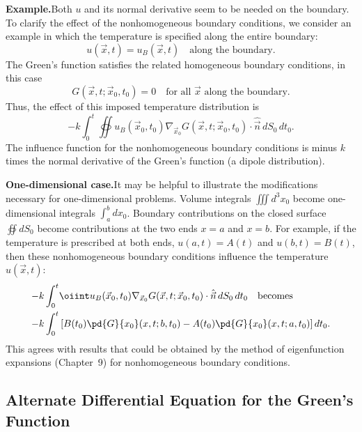 \textbf{Example.}\quad Both $u$ and its normal derivative seem to be needed on the boundary.  To clarify the effect of the nonhomogeneous boundary conditions, we consider an example in which the temperature is specified along the entire boundary:
\[
u(\vec{x},t) = u_B(\vec{x},t) \quad \text{along the boundary.}
\]
The Green's function satisfies the related homogeneous boundary conditions, in this case
\[
G(\vec{x},t;\vec{x}_0,t_0) = 0 \quad \text{for all } \vec{x} \text{ along the boundary.}
\]
Thus, the effect of this imposed temperature distribution is
\[
-k \int_0^t \oiint u_B(\vec{x}_0,t_0)\nabla_{\vec{x}_0} G(\vec{x},t;\vec{x}_0,t_0)\cdot\hat{\vec{n}}\,dS_0\,dt_0.
\]
The influence function for the nonhomogeneous boundary conditions is minus $k$ times the normal derivative of the Green's function (a dipole distribution).

\textbf{One-dimensional case.}\quad It may be helpful to illustrate the modifications necessary for one-dimensional problems.  Volume integrals $\iiint d^3x_0$ become one-dimensional integrals $\int_a^b dx_0$.  Boundary contributions on the closed surface $\oiint dS_0$ become contributions at the two ends $x = a$ and $x = b$.  For example, if the temperature is prescribed at both ends, $u(a,t) = A(t)$ and $u(b,t) = B(t)$, then these nonhomogeneous boundary conditions influence the temperature $u(\vec{x},t)$:
\begin{align*}
-k \int_0^t &\oiint u_B(\vec{x}_0,t_0)\nabla_{\vec{x}_0} G(\vec{x},t;\vec{x}_0,t_0)\cdot\hat{\vec{n}}\,dS_0\,dt_0 \quad \text{becomes}\\
-k \int_0^t &\left[B(t_0)\pd{G}{x_0}(x,t;b,t_0) - A(t_0)\pd{G}{x_0}(x,t;a,t_0)\right] dt_0.
\end{align*}
This agrees with results that could be obtained by the method of eigenfunction expansions (Chapter~9) for nonhomogeneous boundary conditions.

\subsection{Alternate Differential Equation for the Green's Function}
\label{subsec:alt-de-greens-heat}

